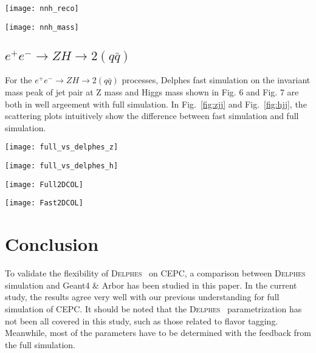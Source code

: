 \documentclass[a4paper,10pt,twoside]{cpc-hepnp}
\begin{document}
\begin{center}
\texttt{[image: nnh\_reco]}
\end{center}
\begin{center}
\texttt{[image: nnh\_mass]}
\end{center}

\subsection{$e^+e^- \to ZH \to 2(q\bar{q})$}
For the $e^+e^- \to ZH \to 2(q\bar{q})$ processes, Delphes fast simulation on the invariant mass peak of jet pair at Z mass and Higgs mass shown in Fig. 6 and Fig. 7 are both in well argeement with full simulation. In Fig.~\ref{fig:zjj} and Fig.~\ref{fig:hjj}, the scattering plots intuitively show the difference between fast simulation and full simulation.

\begin{center}
\texttt{[image: full\_vs\_delphes\_z]}
\end{center}
\begin{center}
\texttt{[image: full\_vs\_delphes\_h]}
\end{center}


\begin{center}
\texttt{[image: Full2DCOL]}
\end{center}
\begin{center}
\texttt{[image: Fast2DCOL]}
\end{center}

\section{Conclusion\label{sec:conclusion}}
To validate the flexibility of {\textsc{Delphes}~} on CEPC, a comparison between {\textsc{Delphes}~} simulation and Geant4 \& Arbor has been studied in this paper. In the current study, the results agree very well with our previous understanding for full simulation of CEPC. It should be noted that the {\textsc{Delphes}~} parametrization has not been all covered in this study, such as those related to flavor tagging. Meanwhile, most of the parameters have to be determined with the feedback from the full simulation.
\vspace{3mm}
\end{document}
